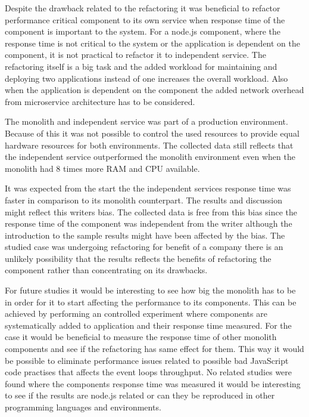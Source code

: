 Despite the drawback related to the refactoring it was beneficial to refactor performance critical component to its own service when response time of the component is important to the system.
For a node.js component, where the response time is not critical to the system or the application is dependent on the component, it is not practical to refactor it to independent service.
The refactoring itself is a big task and the added workload for maintaining and deploying two applications instead of one increases the overall workload.
Also when the application is dependent on the component the added network overhead from microservice architecture has to be considered.

The monolith and independent service was part of a production environment.
Because of this it was not possible to control the used resources to provide equal hardware resources for both environments.
The collected data still reflects that the independent service outperformed the monolith environment even when the monolith had $8$ times more RAM and CPU available.

It was expected from the start the the independent services response time was faster in comparison to its monolith counterpart.
The results and discussion might reflect this writers bias.
The collected data is free from this bias since the response time of the component was independent from the writer although the introduction to the sample results might have been affected by the bias.
The studied case was undergoing refactoring for benefit of a company there is an unlikely possibility that the results reflects the benefits of refactoring the component rather than concentrating on its drawbacks.

For future studies it would be interesting to see how big the monolith has to be in order for it to start affecting the performance to its components.
This can be achieved by performing an controlled experiment where components are systematically added to application and their response time measured.
For the case it would be beneficial to measure the response time of other monolith components and see if the refactoring has same effect for them.
This way it would be possible to eliminate  performance issues related to possible bad JavaScript code practises that affects the event loops throughput.
No related studies were found where the components response time was measured it would be interesting to see if the results are node.js related or can they be reproduced in other programming languages and environments.
